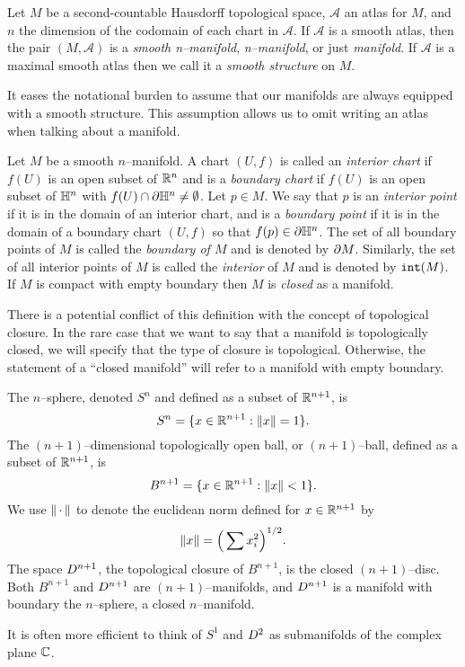 \begin{defn}[Manifold]
	\label{def:manifold}
	Let $M$ be a second-countable Hausdorff topological space, $\mathcal{A}$ an atlas for $M$, and $n$ the dimension of the codomain of each chart in $\mathcal{A}$.
	If $\mathcal{A}$ is a smooth atlas, then the pair $(M,\mathcal{A})$ is a \emph{smooth n--manifold},  \emph{n--manifold}, or just \emph{manifold}.
	If $\mathcal{A}$ is a maximal smooth atlas then we call it a \emph{smooth structure} on $M$.
\end{defn}

It eases the notational burden to assume that our manifolds are always equipped with a smooth structure.
This assumption allows us to omit writing an atlas when talking about a manifold.
	
\begin{defn}[Boundary]
	Let $M$ be a smooth $n$--manifold.
	A chart $(U,f)$ is called an \emph{interior chart} if $f(U)$ is an open subset of $\mathbb{R}^n$ and is a \emph{boundary chart} if $f(U)$ is an open subset of $\mathbb{H}^n$ with $f(U)\cap\partial \mathbb{H}^n\neq\emptyset$.
	Let $p\in M$.
	We say that $p$ is an \emph{interior point} if it is in the domain of an interior chart, and is a \emph{boundary point} if it is in the domain of a boundary chart $(U,f)$ so that $f(p)\in\partial\mathbb{H}^n$.
	The set of all boundary points of $M$ is called the \emph{boundary of $M$} and is denoted by $\partial M$.
	Similarly, the set of all interior points of $M$ is called the \emph{interior} of $M$ and is denoted by $\mathtt{int}(M)$.
	If $M$ is compact with empty boundary then $M$ is \emph{closed} as a manifold.
\end{defn}

There is a potential conflict of this definition with the concept of topological closure.
In the rare case that we want to say that a manifold is topologically closed, we will specify that the type of closure is topological.
Otherwise, the statement of a ``closed manifold'' will refer to a manifold with empty boundary.

\begin{ex}
	The $n$--sphere, denoted $S^n$ and defined as a subset of $\mathbb{R}^{n+1}$, is
	\[
	S^n = \{x\in\mathbb{R}^{n+1}:\left\lVert x \right\rVert=1\}.
	\]
	The $(n+1)$--dimensional topologically open ball, or $(n+1)$--ball, defined as a subset of $\mathbb{R}^{n+1}$, is
	\[
	B^{n+1} = \{x\in\mathbb{R}^{n+1}:\left\lVert x \right\rVert< 1\}.
	\]
	We use $\left\lVert \,\cdot\, \right\rVert$ to denote the euclidean norm defined for $x\in\mathbb{R}^{n+1}$ by
	\[
	\left\lVert x \right\rVert = \Big( \sum x_i^2 \Big)^{1/2}.
	\]
	The space $D^{n+1}$, the topological closure of $B^{n+1}$, is the closed $(n+1)$--disc.
	Both $B^{n+1}$ and $D^{n+1}$ are $(n+1)$--manifolds, and $D^{n+1}$ is a manifold with boundary the $n$--sphere, a closed $n$--manifold.
	
	It is often more efficient to think of $S^1$ and $D^2$ as submanifolds of the complex plane $\mathbb{C}$.
\end{ex}
